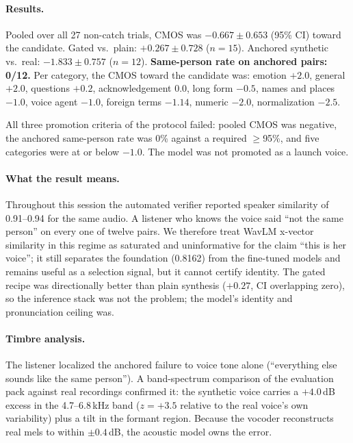 \documentclass[10pt,twocolumn]{article}
\begin{document}
\paragraph{Results.} Pooled over all 27 non-catch trials, CMOS was $-0.667 \pm 0.653$ (95\% CI) toward the candidate. Gated vs.\ plain: $+0.267 \pm 0.728$ ($n=15$). Anchored synthetic vs.\ real: $-1.833 \pm 0.757$ ($n=12$). \textbf{Same-person rate on anchored pairs: 0/12.} Per category, the CMOS toward the candidate was: emotion $+2.0$, general $+2.0$, questions $+0.2$, acknowledgement $0.0$, long form $-0.5$, names and places $-1.0$, voice agent $-1.0$, foreign terms $-1.14$, numeric $-2.0$, normalization $-2.5$.

All three promotion criteria of the protocol failed: pooled CMOS was negative, the anchored same-person rate was 0\% against a required $\ge$95\%, and five categories were at or below $-1.0$. The model was not promoted as a launch voice.

\paragraph{What the result means.} Throughout this session the automated verifier reported speaker similarity of 0.91--0.94 for the same audio. A listener who knows the voice said ``not the same person'' on every one of twelve pairs. We therefore treat WavLM x-vector similarity in this regime as saturated and uninformative for the claim ``this is her voice''; it still separates the foundation (0.8162) from the fine-tuned models and remains useful as a selection signal, but it cannot certify identity. The gated recipe was directionally better than plain synthesis ($+0.27$, CI overlapping zero), so the inference stack was not the problem; the model's identity and pronunciation ceiling was.

\paragraph{Timbre analysis.} The listener localized the anchored failure to voice tone alone (``everything else sounds like the same person''). A band-spectrum comparison of the evaluation pack against real recordings confirmed it: the synthetic voice carries a $+4.0$\,dB excess in the 4.7--6.8\,kHz band ($z=+3.5$ relative to the real voice's own variability) plus a tilt in the formant region. Because the vocoder reconstructs real mels to within $\pm0.4$\,dB, the acoustic model owns the error.
\end{document}
